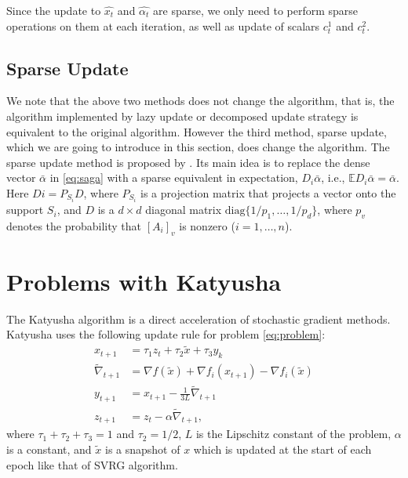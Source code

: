 \documentclass{article}
\begin{document}
\bigbreak

Since the update to $\hat{x_t}$ and
$\hat{\alpha_t}$ %
are sparse, we only need to perform sparse operations on them at each iteration, as well as update of scalars $c_t^1$ and $c_t^2$.


\subsection{Sparse Update}
We note that the above two methods does not change the algorithm, that is, the algorithm implemented by lazy update or decomposed update strategy is equivalent to the original algorithm. However the third method, sparse update, which we are going to introduce in this section, does change the algorithm. The sparse update method is proposed by \cite{mania2015}. Its main idea is to replace the dense vector $\bar{\alpha}$ in \eqref{eq:saga} with a sparse equivalent in expectation, $D_i \bar{\alpha}$, i.e., $\mathbb{E} D_i \bar{\alpha} = \bar{\alpha}$. Here $Di = P_{S_i} D$, where $P_{S_i}$ is a projection matrix that projects a vector onto the support $S_i$, and $D$ is a  $d \times d$ diagonal matrix $\mathrm{diag}\{1/p_1, \dots, 1/p_d\}$, where $p_v$ denotes the probability that $[A_i]_v$ is nonzero ($i=1, \dots, n$).

\section{Problems with Katyusha}
The Katyusha algorithm \cite{allen2016} is a direct acceleration of stochastic gradient methods. Katyusha uses the following update rule for problem \eqref{eq:problem}:
\begin{equation} \label{eq:katyusha}
\begin{aligned}
    x_{t+1} &= \tau_1 z_t + \tau_2 \tilde{x} + \tau_3 y_k \\
    \tilde{\nabla}_{t+1} &= \nabla f(\tilde{x}) + \nabla f_i(x_{t+1}) - \nabla f_i(\tilde{x}) \\
    y_{t+1} &= x_{t+1} - \frac{1}{3L} \tilde{\nabla}_{t+1} \\
    z_{t+1} &= z_{t} - \alpha \tilde{\nabla}_{t+1},
\end{aligned}
\end{equation}
where $\tau_1 + \tau_2 + \tau_3 = 1$ and $\tau_2 = 1/2$, $L$ is the Lipschitz constant of the problem, $\alpha$ is a constant, and $\tilde{x}$ is a snapshot of $x$ which is updated at the start of each epoch like that of SVRG algorithm.
\end{document}
